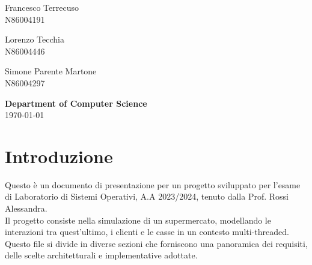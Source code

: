 \documentclass[a4paper, 12pt]{article}
\begin{document}
\begin{titlepage}
    \begin{minipage}{0.30\textwidth}
        \begin{flushleft}
            Francesco Terrecuso \\
            N86004191
        \end{flushleft}
    \end{minipage}
    \begin{minipage}{0.30\textwidth}
        \begin{center}
            Lorenzo Tecchia \\
            N86004446
        \end{center}
    \end{minipage}
    \begin{minipage}{0.35\textwidth}
        \begin{flushright}
            Simone Parente Martone \\
            N86004297
        \end{flushright}
    \end{minipage}

    \vspace{2in}

    \textbf{\large Department of Computer Science} \\

    \today

\end{titlepage}

\newpage

\section{Introduzione}
Questo è un documento di presentazione per un progetto sviluppato per l'esame di Laboratorio di 
Sistemi Operativi, A.A 2023/2024, tenuto dalla Prof. Rossi Alessandra.  \\
Il progetto consiste nella simulazione di un supermercato, modellando le 
interazioni tra quest'ultimo, i clienti e le casse in un contesto multi-threaded. 
Questo file si divide in diverse sezioni che forniscono una panoramica dei 
requisiti, delle scelte architetturali e implementative adottate.
\end{document}
